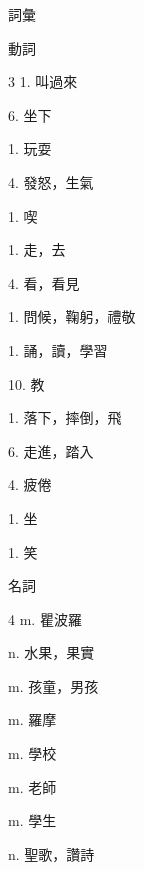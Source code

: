 \documentclass[aspectratio=169]{beamer}
\begin{document}
\begin{frame}{詞彙}
    \footnotesize
    \begin{block}{動詞}
        \begin{VocabCols}{3}
             1.  叫過來
            
             6.  坐下
            
             1.  玩耍
            
             4.  發怒，生氣
            
             1.  喫
            
             1.  走，去
            
             4.  看，看見
            
             1.  問候，鞠躬，禮敬
            
             1.  誦，讀，學習
            
             10.  教
            
             1.  落下，摔倒，飛
            
             6.  走進，踏入
            
             4.  疲倦
            
             1.  坐
            
             1.  笑
        \end{VocabCols}
    \end{block}

    \begin{block}{名詞}
        \begin{VocabCols}{4}
             m. 瞿波羅
            
             n. 水果，果實
            
             m. 孩童，男孩

             m. 羅摩

             m. 學校

             m. 老師

             m. 學生

             n. 聖歌，讚詩
        \end{VocabCols}
    \end{block}


\end{frame}
\end{document}
